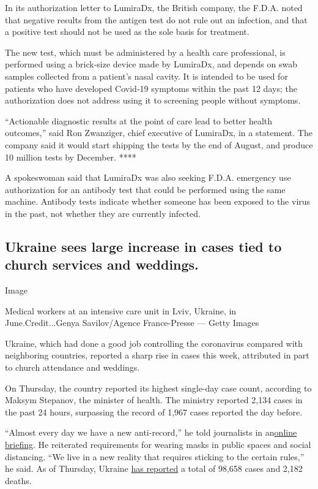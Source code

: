 In its authorization letter to LumiraDx, the British company, the F.D.A.
noted that negative results from the antigen test do not rule out an
infection, and that a positive test should not be used as the sole basis
for treatment.

The new test, which must be administered by a health care professional,
is performed using a brick-size device made by LumiraDx, and depends on
swab samples collected from a patient's nasal cavity. It is intended to
be used for patients who have developed Covid-19 symptoms within the
past 12 days; the authorization does not address using it to screening
people without symptoms.

``Actionable diagnostic results at the point of care lead to better
health outcomes,'' said Ron Zwanziger, chief executive of LumiraDx, in a
statement. The company said it would start shipping the tests by the end
of August, and produce 10 million tests by December. ****

A spokeswoman said that LumiraDx was also seeking F.D.A. emergency use
authorization for an antibody test that could be performed using the
same machine. Antibody tests indicate whether someone has been exposed
to the virus in the past, not whether they are currently infected.

\hypertarget{ukraine-sees-large-increase-in-cases-tied-to-church-services-and-weddings-}{%
\subsection{Ukraine sees large increase in cases tied to church services
and weddings.
}\label{ukraine-sees-large-increase-in-cases-tied-to-church-services-and-weddings-}}

Image

Medical workers at an intensive care unit in Lviv, Ukraine, in
June.Credit...Genya Savilov/Agence France-Presse --- Getty Images

Ukraine, which had done a good job controlling the coronavirus compared
with neighboring countries, reported a sharp rise in cases this week,
attributed in part to church attendance and weddings.

On Thursday, the country reported its highest single-day case count,
according to Maksym Stepanov, the minister of health. The ministry
reported 2,134 cases in the past 24 hours, surpassing the record of
1,967 cases reported the day before.

``Almost every day we have a new anti-record,'' he told journalists in
an\href{https://www.facebookcorewwwi.onion/moz.ukr/posts/1625809094248856?__cft__\%5b0\%5d=AZWftQvWWweGrRq4vYAFerKH8lpIPq_eoD6NzgxTN49Pftrt5kehnxb4v65TS3PMOnGqPCS1jzuLdiclb1RAsOifpeRwHca4VfT7S9_HKXz5RM1OIGEJBhlbotVEbSAqfZil8ZpIHPAf2SfWxLRY6PgBVI3f3_mdDS9N4A0h0w9IEg\&__tn__=\%2CP-R}{online
briefing}. He reiterated requirements for wearing masks in public spaces
and social distancing. ``We live in a new reality that requires sticking
to the certain rules,'' he said. As of Thursday, Ukraine
\href{https://www.nytimes3xbfgragh.onion/interactive/2020/world/coronavirus-maps.html}{has
reported} a total of 98,658 cases and 2,182 deaths.

